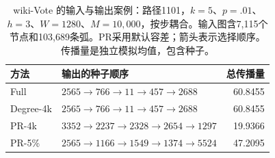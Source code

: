 \begin{table}[htbp]
\caption{wiki-Vote 的输入与输出案例：路径1101，$k=5$、$p=.01$、$h=3$、$W=1280$、$M=10,000$，按步耦合。输入图含7,115个节点和103,689条弧。PR采用默认容差；箭头表示选择顺序。传播量是独立模拟均值，包含种子。}\label{tab:case}
\begin{tabularx}{\linewidth}{lXr}\toprule
方法 & 输出的种子顺序 & 总传播量 \\ \midrule
Full & $2565\to 766\to 11\to 457\to 2688$ & 60.8455 \\
Degree-4k & $2565\to 766\to 11\to 457\to 2688$ & 60.8455 \\
PR-4k & $3352\to 2237\to 2328\to 2654\to 1297$ & 19.9366 \\
PR-5\% & $2565\to 1166\to 1549\to 1374\to 5524$ & 47.2095 \\
\bottomrule\end{tabularx}
\end{table}